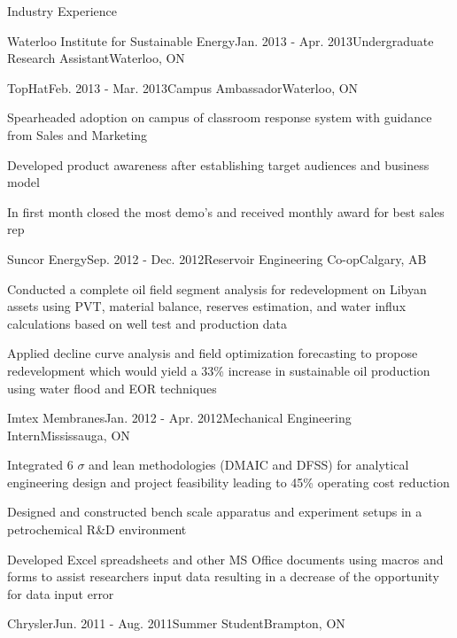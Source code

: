 \documentclass{resume} %
\begin{document}
\begin{rSection}{Industry Experience}
\begin{rSubsection}{Waterloo Institute for Sustainable Energy}{Jan. 2013 - Apr. 2013}{Undergraduate Research Assistant}{Waterloo, ON}
\end{rSubsection}


\begin{rSubsection}{TopHat}{Feb. 2013 - Mar. 2013}{Campus Ambassador}{Waterloo, ON}
\item Spearheaded adoption on campus of classroom response system with guidance from Sales and Marketing
\item Developed product awareness after establishing target audiences and business model
\item In first month closed the most demo's and received monthly award for best sales rep
\end{rSubsection}


\begin{rSubsection}{Suncor Energy}{Sep. 2012 - Dec. 2012}{Reservoir Engineering Co-op}{Calgary, AB}
\item Conducted a complete oil field segment analysis for redevelopment on Libyan assets using PVT, material balance, reserves estimation, and water influx calculations based on well test and production data 
\item Applied decline curve analysis and field optimization forecasting to propose redevelopment which would yield a 33\% increase in sustainable oil production using water flood and EOR techniques
\end{rSubsection}


\begin{rSubsection}{Imtex Membranes}{Jan. 2012 - Apr. 2012}{Mechanical Engineering Intern}{Mississauga, ON}

\item Integrated 6 $\sigma$ and lean methodologies (DMAIC and DFSS) for analytical engineering design and project feasibility leading to 45\% operating cost reduction 
\item Designed and constructed bench scale apparatus and experiment setups in a petrochemical R\&D environment
\item Developed Excel spreadsheets and other MS Office documents using macros and forms to assist researchers input data resulting in a decrease of the opportunity for data input error
\end{rSubsection}

\begin{rSubsection}{Chrysler}{Jun. 2011 - Aug. 2011}{Summer Student}{Brampton, ON}


\end{rSubsection}
\end{rSection}
\end{document}
